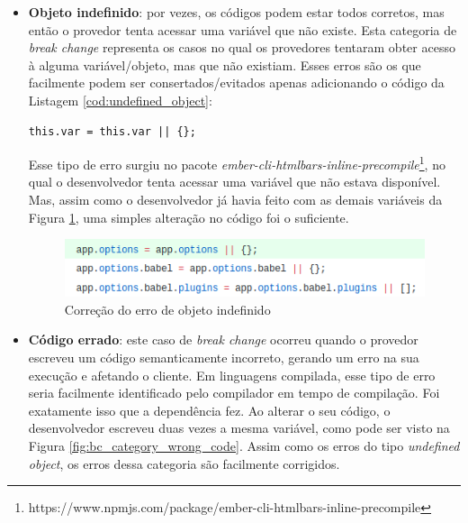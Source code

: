 \begin{itemize}
    Na Figura \ref{fig:bc_category_change_type} o provedor \textit{socket.io}\footnote{https://www.npmjs.com/package/socket.io} alterou alguns \textit{arrays} para \textit{object}\footnote{https://github.com/socketio/socket.io/commit/b73d9bea4efb48277eee685763026ff2df5a79ab}. Anteriormente, os clientes iteravam nesses \textit{arrays}, mas após essa alteração, os clientes foram afetados.

    \item \textbf{Objeto indefinido}: por vezes, os códigos podem estar todos corretos, mas então o provedor tenta acessar uma variável que não existe. Esta categoria de \textit{break change} representa os casos no qual os provedores tentaram obter acesso à alguma variável/objeto, mas que não existiam. Esses erros são os que facilmente podem ser consertados/evitados apenas adicionando o código da Listagem \ref{cod:undefined_object}:

    \begin{lstlisting}[style=bash, label=cod:undefined_object]
    this.var = this.var || {};
    \end{lstlisting}

    Esse tipo de erro surgiu no pacote \textit{ember-cli-htmlbars-inline-precompile}\footnote{https://www.npmjs.com/package/ember-cli-htmlbars-inline-precompile}, no qual o desenvolvedor tenta acessar uma variável que não estava disponível. Mas, assim como o desenvolvedor já havia feito com as demais variáveis da Figura \ref{fig:bc_category_undefined_object}, uma simples alteração no código foi o suficiente.

    \begin{figure}
        \centering
        \includegraphics[scale=0.7]{figuras/bc_category_undefined_object.png}
        \caption{Correção do erro de objeto indefinido}
        \label{fig:bc_category_undefined_object}
    \end{figure}{}

    \item \textbf{Código errado}: este caso de \textit{break change} ocorreu quando o provedor escreveu um código semanticamente incorreto, gerando um erro na sua execução e afetando o cliente. Em linguagens compilada, esse tipo de erro seria facilmente identificado pelo compilador em tempo de compilação. Foi exatamente isso que a dependência fez. Ao alterar o seu código, o desenvolvedor escreveu duas vezes a mesma variável, como pode ser visto na Figura \ref{fig:bc_category_wrong_code}. Assim como os erros do tipo \textit{undefined object}, os erros dessa categoria  são facilmente corrigidos.


\end{itemize}
